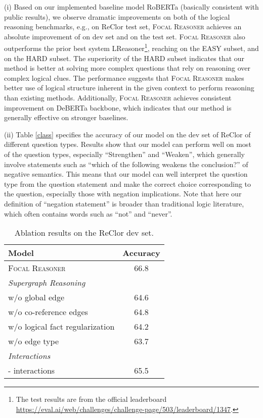 \documentclass[11pt]{article}
\begin{document}
(i) Based on our implemented baseline model RoBERTa (basically consistent with public results), we observe dramatic improvements on both of the logical reasoning benchmarks, e.g., on ReClor test set, \textsc{Focal Reasoner} achieves an absolute improvement of  on dev set and  on the test set. \textsc{Focal Reasoner} also outperforms the prior best system LReasoner\footnote{The test results are from the official leaderboard \url{https://eval.ai/web/challenges/challenge-page/503/leaderboard/1347}.}, reaching  on the EASY subset, and  on the HARD subset. The superiority of the HARD subset indicates that our method is better at solving more complex questions that rely on reasoning over complex logical clues. The performance suggests that \textsc{Focal Reasoner} makes better use of logical structure inherent in the given context to perform reasoning than existing methods. Additionally, \textsc{Focal Reasoner} achieves consistent improvement on DeBERTa backbone, which indicates that our method is generally effective on stronger baselines.


(ii) Table \ref{class} specifies the accuracy of our model on the dev set of ReClor of different question types. Results show that our model can perform well on most of the question types, especially ``Strengthen'' and ``Weaken'', which generally involve statements such as ``which of the following weakens the conclusion?'' of negative semantics. This means that our model can well interpret the question type from the question statement and make the correct choice corresponding to the question, especially those with negation implications. Note that here our definition of ``negation statement'' is broader than traditional logic literature, which often contains words such as ``not'' and ``never''.




\begin{table}
\centering
\setlength{\belowcaptionskip}{5pt}
\vspace*{-3mm}
\small
\setlength{\tabcolsep}{16.0pt}
\begin{tabular}{lc}
    \toprule
    Model    & Accuracy \\
    \midrule
    \textsc{Focal Reasoner} & 66.8\scriptsize \\
    \midrule
    \textit{Supergraph Reasoning}  \\
    \quad w/o global edge  & 64.6\scriptsize\\
    \quad w/o co-reference edges & 64.8\scriptsize\\
    \quad w/o logical fact regularization & 64.2\scriptsize \\
\quad w/o edge type & 63.7\scriptsize \\
\midrule
    \textit{Interactions} \\
    \quad - interactions&  65.5\scriptsize  \\
    \bottomrule
  \end{tabular}
  \caption{Ablation results on the ReClor dev set.}\label{ablation}
\vspace*{-5mm}
\end{table}
\end{document}
